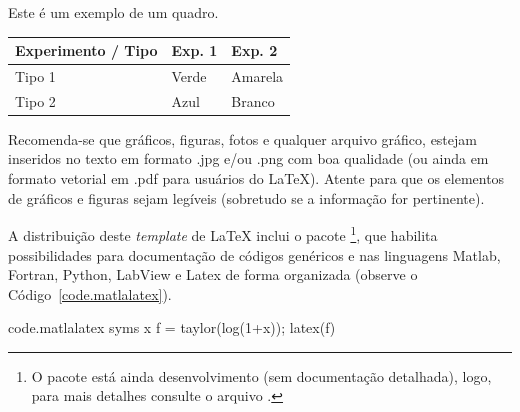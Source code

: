 \documentclass[12pt, a4paper, twoside, twocolumn]{article}
\begin{document}
\begin{quadro}[ht!]
  \centering {} \setlength\aboverulesep{0pt} \setlength\belowrulesep{0pt}
  \caption{Este é um exemplo de um quadro.}
	\fontsize{11}{12}\selectfont 
    \begin{tabular}{| C{2.8cm} | C{1.8cm} | C{1.8cm} |}
    \hline
    \textbf{ Experimento / Tipo } & \textbf{Exp. 1} & \textbf{Exp. 2}\\
	\midrule
		Tipo 1& Verde & Amarela\\
		 Tipo 2 & Azul & Branco\\
		\hline
    \end{tabular}
    \label{quad.exemplo}%
\end{quadro}%



Recomenda-se que gráficos, figuras, fotos e qualquer arquivo gráfico, estejam inseridos no texto em formato .jpg e/ou .png com boa qualidade (ou ainda em formato vetorial em .pdf para usuários do \LaTeX\xspace). Atente para que os elementos de gráficos e figuras sejam legíveis (sobretudo se a informação for pertinente).

A distribuição deste \textit{template} de \LaTeX\xspace inclui o pacote \footnote{O pacote está ainda desenvolvimento (sem documentação detalhada), logo, para mais detalhes consulte o arquivo .}, que habilita possibilidades para documentação de códigos genéricos e nas linguagens Matlab, Fortran, Python, LabView e Latex de forma organizada (observe o Código~\ref{code.matlalatex}).

\begin{matlabcode}{code.matlalatex}
  syms x
  f = taylor(log(1+x));
  latex(f)
\end{matlabcode}
\end{document}
